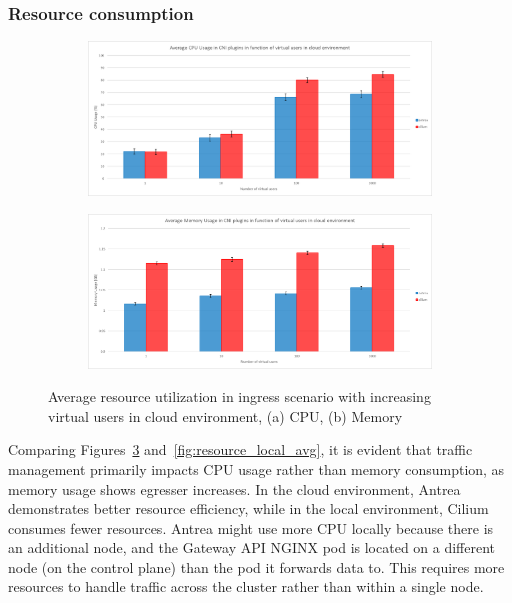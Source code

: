 \subsubsection{Resource consumption}
\label{sec:ingressResoureComsumption}


\begin{figure}[H]
    \centering
    \begin{subfigure}[b]{0.8\textwidth}
        \includegraphics[width=\textwidth]{plots/traffic-splitting/cpu_cloud.png}
        \caption{}
        \label{fig:cpu_cloud_avg}
    \end{subfigure}
    \begin{subfigure}[b]{0.8\textwidth}
        \includegraphics[width=\textwidth]{plots/traffic-splitting/memory_cloud.png}
        \caption{}
        \label{fig:memory_cloud_avg}
    \end{subfigure}
    
    \caption{Average resource utilization in ingress scenario with increasing virtual users in cloud environment, (a) CPU, (b) Memory}
    \label{fig:resource_cloud_avg}
\end{figure}

Comparing Figures~\ref{fig:resource_cloud_avg} and~\ref{fig:resource_local_avg}, it is evident that traffic management primarily impacts CPU usage rather than memory consumption, as memory usage shows egresser increases. In the cloud environment, Antrea demonstrates better resource efficiency, while in the local environment, Cilium consumes fewer resources. Antrea might use more CPU locally because there is an additional node, and the Gateway API NGINX pod is located on a different node (on the control plane) than the pod it forwards data to. This requires more resources to handle traffic across the cluster rather than within a single node.

